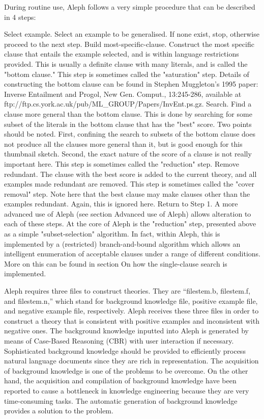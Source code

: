 During routine use, Aleph follows a very simple procedure that can be described in 4 steps:

Select example. Select an example to be generalised. If none exist, stop, otherwise proceed to the next step.
Build most-specific-clause. Construct the most specific clause that entails the example selected, and is within language restrictions provided. This is usually a definite clause with many literals, and is called the "bottom clause." This step is sometimes called the "saturation" step. Details of constructing the bottom clause can be found in Stephen Muggleton's 1995 paper: Inverse Entailment and Progol, New Gen. Comput., 13:245-286, available at ftp://ftp.cs.york.ac.uk/pub/ML_GROUP/Papers/InvEnt.ps.gz.
Search. Find a clause more general than the bottom clause. This is done by searching for some subset of the literals in the bottom clause that has the "best" score. Two points should be noted. First, confining the search to subsets of the bottom clause does not produce all the clauses more general than it, but is good enough for this thumbnail sketch. Second, the exact nature of the score of a clause is not really important here. This step is sometimes called the "reduction" step.
Remove redundant. The clause with the best score is added to the current theory, and all examples made redundant are removed. This step is sometimes called the "cover removal" step. Note here that the best clause may make clauses other than the examples redundant. Again, this is ignored here. Return to Step 1.
A more advanced use of Aleph (see section Advanced use of Aleph) allows alteration to each of these steps. At the core of Aleph is the "reduction" step, presented above as a simple "subset-selection" algorithm. In fact, within Aleph, this is implemented by a (restricted) branch-and-bound algorithm which allows an intelligent enumeration of acceptable clauses under a range of different conditions. More on this can be found in section On how the single-clause search is implemented.



Aleph requires three files to construct theories. They are “filestem.b, filestem.f, and filestem.n,” which stand for background knowledge file, positive example file, and negative example file, respectively. Aleph receives these three files in order to construct a theory that is consistent with positive examples and inconsistent with negative ones.
The background knowledge inputted into Aleph is generated by means of Case-Based Reasoning (CBR) with user interaction if necessary. Sophisticated background knowledge should be provided to efficiently process natural language documents since they are rich in representation. The acquisition of background knowledge is one of the problems to be overcome. On the other hand, the acquisition and compilation of background knowledge have been reported to cause a bottleneck in knowledge engineering because they are very time-consuming tasks. The automatic generation of background knowledge provides a solution to the problem.

